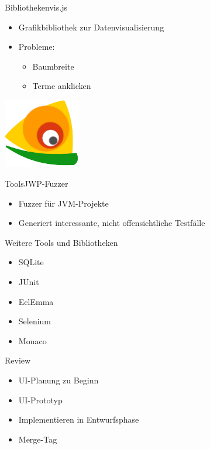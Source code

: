 \documentclass[10pt]{beamer}
\begin{document}
\begin{frame}{Bibliotheken}{vis.js}
	\begin{itemize}
		\item Grafikbibliothek zur Datenvisualisierung
		\item Probleme: 
			\begin{itemize}
				\item{Baumbreite}
				\item{Terme anklicken}
			\end{itemize}
	\end{itemize}
	\vspace{2.8cm}
    \hfill\includegraphics[width = 0.25\textwidth]{img/vis-cropped}
\end{frame}

\begin{frame}{Tools}{JWP-Fuzzer}
	\begin{itemize}
		\item Fuzzer für JVM-Projekte
		\item Generiert interessante, nicht offensichtliche Testfälle
	\end{itemize}
\end{frame}


\begin{frame}{Weitere Tools und Bibliotheken}{}
	\begin{itemize}
		\item SQLite
		\item JUnit
		\item EclEmma
		\item Selenium
		\item Monaco
	\end{itemize}
\end{frame}


\begin{frame}{Review}{}
	\begin{itemize}
		\item UI-Planung zu Beginn
		\item UI-Prototyp
		\item Implementieren in Entwurfsphase
		\item Merge-Tag
	\end{itemize}
\end{frame}
\end{document}
